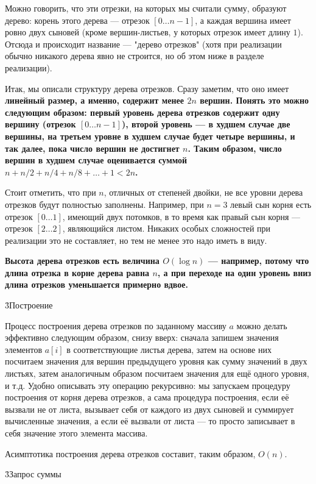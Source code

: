 Можно говорить, что эти отрезки, на которых мы считали сумму, образуют дерево: корень этого дерева --- отрезок $[0 \ldots n-1]$, а каждая вершина имеет ровно двух сыновей (кроме вершин-листьев, у которых отрезок имеет длину $1$). Отсюда и происходит название --- "дерево отрезков" (хотя при реализации обычно никакого дерева явно не строится, но об этом ниже в разделе реализации).

Итак, мы описали структуру дерева отрезков. Сразу заметим, что оно имеет \bf{линейный размер}, а именно, содержит менее $2n$ вершин. Понять это можно следующим образом: первый уровень дерева отрезков содержит одну вершину (отрезок $[0 \ldots n-1]$), второй уровень --- в худшем случае две вершины, на третьем уровне в худшем случае будет четыре вершины, и так далее, пока число вершин не достигнет $n$. Таким образом, число вершин в худшем случае оценивается суммой $n + n/2 + n/4 + n/8 + \ldots + 1 < 2n$.

Стоит отметить, что при $n$, отличных от степеней двойки, не все уровни дерева отрезков будут полностью заполнены. Например, при $n=3$ левый сын корня есть отрезок $[0 \ldots 1]$, имеющий двух потомков, в то время как правый сын корня --- отрезок $[2 \ldots 2]$, являющийся листом. Никаких особых сложностей при реализации это не составляет, но тем не менее это надо иметь в виду.

\bf{Высота} дерева отрезков есть величина $O (\log n)$ --- например, потому что длина отрезка в корне дерева равна $n$, а при переходе на один уровень вниз длина отрезков уменьшается примерно вдвое.


\h3{Построение}

Процесс построения дерева отрезков по заданному массиву $a$ можно делать эффективно следующим образом, снизу вверх: сначала запишем значения элементов $a[i]$ в соответствующие листья дерева, затем на основе них посчитаем значения для вершин предыдущего уровня как сумму значений в двух листьях, затем аналогичным образом посчитаем значения для ещё одного уровня, и т.д. Удобно описывать эту операцию рекурсивно: мы запускаем процедуру построения от корня дерева отрезков, а сама процедура построения, если её вызвали не от листа, вызывает себя от каждого из двух сыновей и суммирует вычисленные значения, а если её вызвали от листа --- то просто записывает в себя значение этого элемента массива.

Асимптотика построения дерева отрезков составит, таким образом, $O(n)$.


\h3{Запрос суммы}

